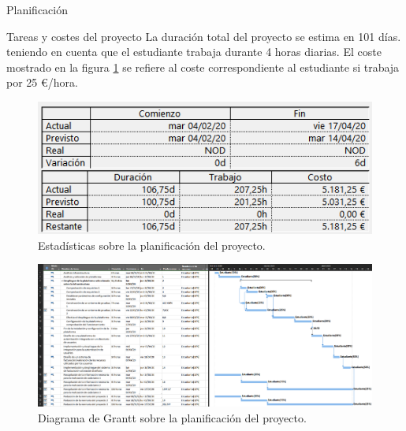 \begin{chapter}{Planificación}
\begin{section}{Tareas y costes del proyecto}
La duración total del proyecto se estima en 101 días. teniendo en cuenta que el estudiante trabaja durante 4 horas diarias. El coste mostrado en la figura \ref{fig:estadisticasproyecto} se refiere al coste correspondiente al estudiante si trabaja por 25 €/hora. 
\begin{figure}[h!]
  \centering
  \includegraphics[width=1\textwidth]{imaxes/extras/estadisticasProyecto.png}
  \caption{Estadísticas sobre la planificación del proyecto.}
  \label{fig:estadisticasproyecto}
\end{figure}
\FloatBarrier
\begin{landscape}
\begin{figure}[hp]
  \centering
  \includegraphics[width=1.5\textwidth]{imaxes/extras/diagramaGranttt.png}
  \caption{Diagrama de Grantt sobre la planificación del proyecto.}
  \label{fig:tareasproyecto}
\end{figure}
\end{landscape}
\FloatBarrier
\end{section}


\end{chapter}
